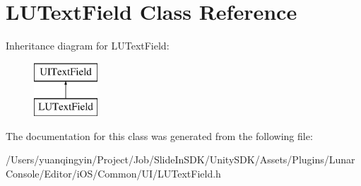 \hypertarget{interface_l_u_text_field}{}\section{L\+U\+Text\+Field Class Reference}
\label{interface_l_u_text_field}
Inheritance diagram for L\+U\+Text\+Field\+:\begin{figure}[H]
\begin{center}
\leavevmode
\includegraphics[height=2.000000cm]{interface_l_u_text_field}
\end{center}
\end{figure}


The documentation for this class was generated from the following file\+:\begin{DoxyCompactItemize}
\item 
/\+Users/yuanqingyin/\+Project/\+Job/\+Slide\+In\+S\+D\+K/\+Unity\+S\+D\+K/\+Assets/\+Plugins/\+Lunar\+Console/\+Editor/i\+O\+S/\+Common/\+U\+I/L\+U\+Text\+Field.\+h\end{DoxyCompactItemize}
